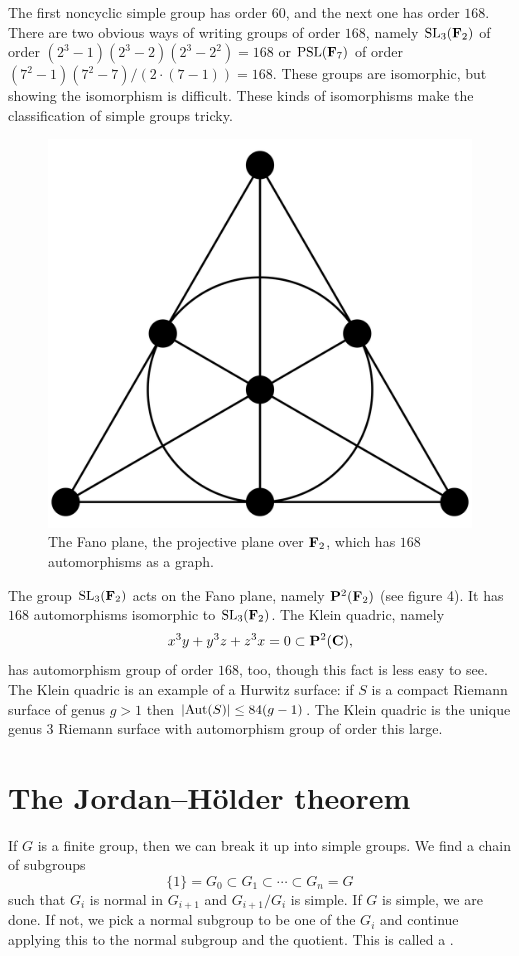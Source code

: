\documentclass[11pt, oneside]{amsart}
\begin{document}
The first noncyclic simple group has order $60$, and the next one has order $168$. There are two obvious ways of writing groups of order $168$, namely $\operatorname{SL}_3(\mathbf F_2)$ of order $(2^3-1)(2^3 - 2)(2^3 - 2^2) = 168$ or $\operatorname{PSL}(\mathbf F_7)$ of order $(7^2 - 1)(7^2-7)/(2\cdot(7-1)) =168$. These groups are isomorphic, but showing the isomorphism is difficult. These kinds of isomorphisms make the classification of simple groups tricky.
\begin{figure}
\centering
\includegraphics[scale=0.1]{images/fano_plane}
\caption{The Fano plane, the projective plane over $\mathbf F_2$, which has $168$ automorphisms as a graph.}
\end{figure}
The group $\operatorname{SL}_3(\mathbf F_2)$ acts on the Fano plane, namely $\mathbf P^2(\mathbf F_2)$ (see figure 4). It has $168$ automorphisms isomorphic to $\operatorname{SL}_3(\mathbf F_2)$. The Klein quadric, namely 
$$
x^3y + y^3z + z^3x = 0\subset \mathbf P^2(\mathbf C),
$$
has automorphism group of order $168$, too, though this fact is less easy to see. The Klein quadric is an example of a Hurwitz surface: if $S$ is a compact Riemann surface of genus $g> 1$ then $\left \lvert \operatorname{Aut} (S) \right \rvert \le  84(g-1)$. The Klein quadric is the unique genus $3$ Riemann surface with automorphism group of order this large.

\section{The Jordan--Hölder theorem}
If $G$ is a finite group, then we can break it up into simple groups. We find a chain of subgroups
$$
\{1\} = G_0 \subset G_1 \subset \cdots\subset G_n = G
$$
such that $G_i$ is normal in $G_{i+1}$ and $G_{i+1}/G_i$ is simple. If $G$ is simple, we are done. If not, we pick a normal subgroup to be one of the $G_i$ and continue applying this to the normal subgroup and the quotient. This is called a . 
\end{document}
